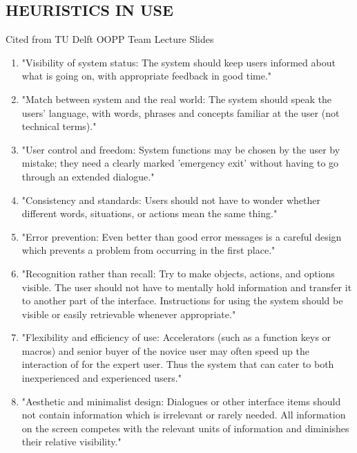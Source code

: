 \subsection{HEURISTICS IN USE}
Cited from TU Delft OOPP Team Lecture Slides \cite{lecture-slides}
\begin{enumerate}
    

\item "Visibility of system status: The system should keep users informed about what is going on, with appropriate feedback in good time."

\item "Match between system and the real world: The system should speak the users' language, with words, phrases and concepts familiar at the user (not technical terms)."

\item "User control and freedom: System functions may be chosen by the user by mistake; they need a clearly marked 'emergency exit' without having to go through an extended dialogue."

\item "Consistency and standards: Users should not have to wonder whether different words, situations, or actions mean the same thing."

\item "Error prevention: Even better than good error messages is a careful design which prevents a problem from occurring in the first place."

\item "Recognition rather than recall: Try to make objects, actions, and options visible. The user should not have to mentally hold information and transfer it to another part of the interface. Instructions for using the system should be visible or easily retrievable whenever appropriate."

\item "Flexibility and efficiency of use: Accelerators (such as a function keys or macros) and senior buyer of the novice user may often speed up the interaction of for the expert user. Thus the system that can cater to both inexperienced and experienced users."

\item "Aesthetic and minimalist design: Dialogues or other interface items should not contain information which is irrelevant or rarely needed. All information on the screen competes with the relevant units of information and diminishes their relative visibility."


\end{enumerate}
